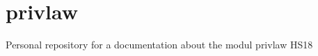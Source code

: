 \hypertarget{privlaw}{%
\section{privlaw}\label{privlaw}}

Personal repository for a documentation about the modul privlaw HS18
